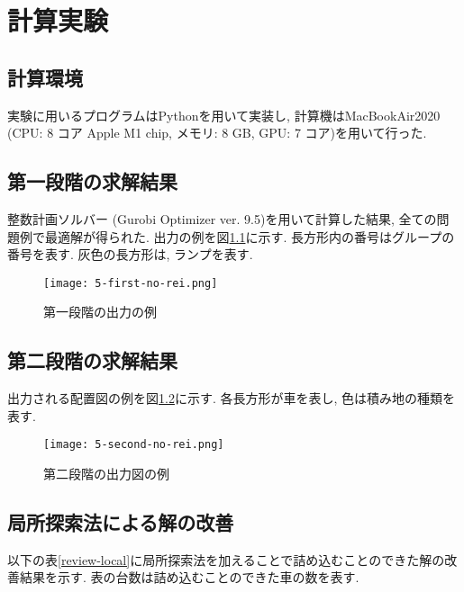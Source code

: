\chapter{計算実験}\label{computational_result}
\section{計算環境}
実験に用いるプログラムはPythonを用いて実装し, 計算機はMacBookAir2020 (CPU: 8 コア Apple M1 chip, メモリ: 8 GB, GPU: 7 コア)を用いて行った. 

\section{第一段階の求解結果}
整数計画ソルバー (Gurobi Optimizer ver. 9.5)を用いて計算した結果, 全ての問題例で最適解が得られた. 
出力の例を図\ref{first-no-rei}に示す. 
長方形内の番号はグループの番号を表す. 
灰色の長方形は, ランプを表す. \\

\begin{figure}[b]
    \texttt{[image: 5-first-no-rei.png]}
    \caption{第一段階の出力の例}
    \label{first-no-rei}
\end{figure}
\clearpage

\section{第二段階の求解結果}
出力される配置図の例を図\ref{second-no-rei}に示す. 
各長方形が車を表し, 色は積み地の種類を表す. \\

\begin{figure}[b]
    \texttt{[image: 5-second-no-rei.png]}
    \caption{第二段階の出力図の例}
    \label{second-no-rei}
\end{figure}

\section{局所探索法による解の改善}
以下の表\ref{review-local}に局所探索法を加えることで詰め込むことのできた解の改善結果を示す. 
表の台数は詰め込むことのできた車の数を表す. 

